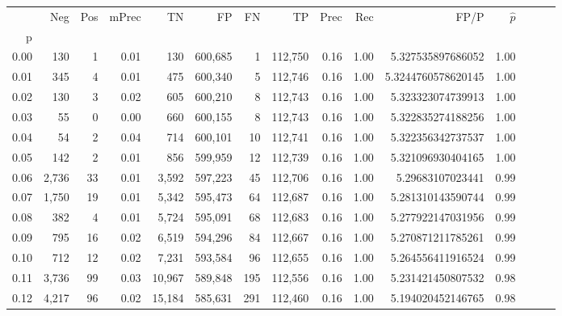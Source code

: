 \begin{tabular}{rrrrrrrrrrrrrrr}
\toprule
{} &     Neg &    Pos & mPrec &       TN &       FP &       FN &       TP &  Prec &   Rec &                    FP/P & $\hat{p}$ \\
p    &         &        &       &          &          &          &          &       &       &                         &           \\
\midrule
0.00 &     130 &      1 &  0.01 &      130 &  600,685 &        1 &  112,750 &  0.16 &  1.00 &       5.327535897686052 &      1.00 \\
0.01 &     345 &      4 &  0.01 &      475 &  600,340 &        5 &  112,746 &  0.16 &  1.00 &      5.3244760578620145 &      1.00 \\
0.02 &     130 &      3 &  0.02 &      605 &  600,210 &        8 &  112,743 &  0.16 &  1.00 &       5.323323074739913 &      1.00 \\
0.03 &      55 &      0 &  0.00 &      660 &  600,155 &        8 &  112,743 &  0.16 &  1.00 &       5.322835274188256 &      1.00 \\
0.04 &      54 &      2 &  0.04 &      714 &  600,101 &       10 &  112,741 &  0.16 &  1.00 &       5.322356342737537 &      1.00 \\
0.05 &     142 &      2 &  0.01 &      856 &  599,959 &       12 &  112,739 &  0.16 &  1.00 &       5.321096930404165 &      1.00 \\
0.06 &   2,736 &     33 &  0.01 &    3,592 &  597,223 &       45 &  112,706 &  0.16 &  1.00 &        5.29683107023441 &      0.99 \\
0.07 &   1,750 &     19 &  0.01 &    5,342 &  595,473 &       64 &  112,687 &  0.16 &  1.00 &       5.281310143590744 &      0.99 \\
0.08 &     382 &      4 &  0.01 &    5,724 &  595,091 &       68 &  112,683 &  0.16 &  1.00 &       5.277922147031956 &      0.99 \\
0.09 &     795 &     16 &  0.02 &    6,519 &  594,296 &       84 &  112,667 &  0.16 &  1.00 &       5.270871211785261 &      0.99 \\
0.10 &     712 &     12 &  0.02 &    7,231 &  593,584 &       96 &  112,655 &  0.16 &  1.00 &       5.264556411916524 &      0.99 \\
0.11 &   3,736 &     99 &  0.03 &   10,967 &  589,848 &      195 &  112,556 &  0.16 &  1.00 &       5.231421450807532 &      0.98 \\
0.12 &   4,217 &     96 &  0.02 &   15,184 &  585,631 &      291 &  112,460 &  0.16 &  1.00 &       5.194020452146765 &      0.98 \\

\end{tabular}
